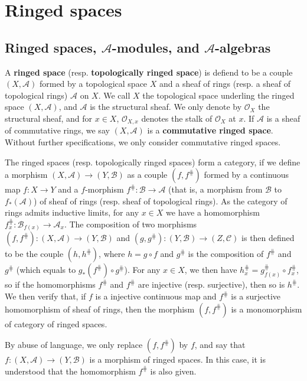 \section{Ringed spaces}
\subsection{Ringed spaces, \texorpdfstring{$\mathscr{A}$}{A}-modules, and \texorpdfstring{$\mathscr{A}$}{A}-algebras}
A \textbf{ringed space} (resp. \textbf{topologically ringed space}) is defiend to be a couple $(X,\mathscr{A})$ formed by a topological space $X$ and a sheaf of rings (resp. a sheaf of topological rings) $\mathscr{A}$ on $X$. We call $X$ the topological space underling the ringed space $(X,\mathscr{A})$, and $\mathscr{A}$ is the structural sheaf. We only denote by $\mathscr{O}_X$ the structural sheaf, and for $x\in X$, $\mathscr{O}_{X,x}$ denotes the stalk of $\mathscr{O}_X$ at $x$. If $\mathscr{A}$ is a sheaf of commutative rings, we say $(X,\mathscr{A})$ is a \textbf{commutative ringed space}. Without further specifications, we only consider commutative ringed spaces.\par
The ringed spaces (resp. topologically ringed spaces) form a category, if we define a morphism $(X,\mathscr{A})\to(Y,\mathscr{B})$ as a couple $(f,f^{\hash})$ formed by a continuous map $f:X\to Y$ and a $f$-morphism $f^{\hash}:\mathscr{B}\to\mathscr{A}$ (that is, a morphism from $\mathscr{B}$ to $f_*(\mathscr{A})$) of sheaf of rings (resp. sheaf of topological rings). As the category of rings admits inductive limits, for any $x\in X$ we have a homomorphism $f^{\hash}_x:\mathscr{B}_{f(x)}\to\mathscr{A}_x$. The composition of two morphisms $(f,f^{\hash}):(X,\mathscr{A})\to(Y,\mathscr{B})$ and $(g,g^{\hash}):(Y,\mathscr{B})\to(Z,\mathscr{C})$ is then defined to be the couple $(h,h^{\hash})$, where $h=g\circ f$ and $g^{\hash}$ is the composition of $f^{\hash}$ and $g^{\hash}$ (which equals to $g_*(f^{\hash})\circ g^{\hash}$). For any $x\in X$, we then have $h^{\hash}_x=g^{\hash}_{f(x)}\circ f^{\hash}_x$, so if the homomorphisms $f^{\hash}$ and $f^{\hash}$ are injective (resp. surjective), then so is $h^{\hash}$. We then verify that, if $f$ is a injective continuous map and $f^{\hash}$ is a surjective homomorphism of sheaf of rings, then the morphism $(f,f^{\hash})$ is a monomorphism of category of ringed spaces.\par
By abuse of language, we only replace $(f,f^{\hash})$ by $f$, and say that $f:(X,\mathscr{A})\to(Y,\mathscr{B})$ is a morphism of ringed spaces. In this case, it is understood that the homomorphism $f^{\hash}$ is also given.\par

